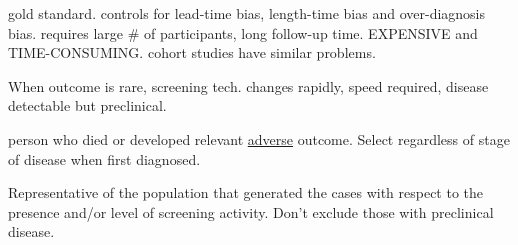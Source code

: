 \documentclass[landscape]{article}
\begin{document}
\begin{multicols}{3}
			\begin{description}
			\item[RCT] gold standard. controls for lead-time bias, length-time bias and over-diagnosis bias. requires large \# of participants, long follow-up time. EXPENSIVE and TIME-CONSUMING. cohort studies have similar problems.
			\item[case-control] When outcome is rare, screening tech. changes rapidly, speed required, disease detectable but preclinical.
				\begin{description}
					\item[Case] person who died or developed relevant \underline{adverse} outcome. Select regardless of stage of disease when first diagnosed.
					\item[Control] Representative of the population that generated the cases with respect to the presence and/or level of screening activity. Don't exclude those with preclinical disease.
			\end{description}
		\end{description}
		
\end{multicols}




\end{document}
